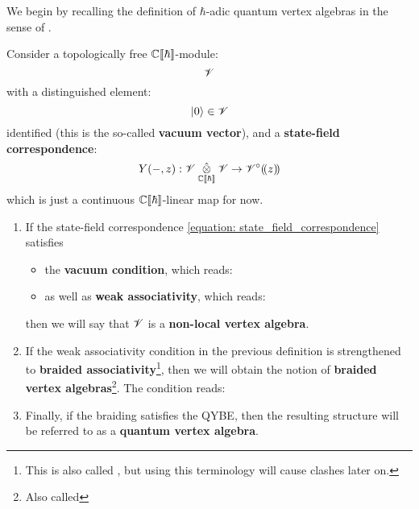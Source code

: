        We begin by recalling the definition of $\hbar$-adic quantum vertex algebras in the sense of \cite{etingof_kazhdan_quantisation_5}. 

        \begin{definition} \label{def: formal_quantum_vertex_algebras}
            Consider a topologically free $\mathbb{C}[\![\hbar]\!]$-module:
                $$\mathscr{V}$$
            with a distinguished element:
                $$\lvert {0} \rangle \in \mathscr{V}$$
            identified (this is the so-called \textbf{vacuum vector}), and a \textbf{state-field correspondence}:
            \begin{equation} \label{equation: state_field_correspondence}
                Y(-, z): \scrV \hattensor_{\bbC[\![\hbar]\!]} \scrV \to \scrV^{\circ}(\!(z)\!)
            \end{equation}
            which is just a continuous $\mathbb{C}[\![\hbar]\!]$-linear map for now.
            \begin{enumerate}
                \item If the state-field correspondence \eqref{equation: state_field_correspondence} satisfies \:
                \begin{itemize}
                    \item the \textbf{vacuum condition}, which reads:
                    \item as well as \textbf{weak associativity}, which reads:
                \end{itemize}
                then we will say that $\mathscr{V}$ is a \textbf{non-local vertex algebra}.
                
                
                \item If the weak associativity condition in the previous definition is strengthened to \textbf{braided associativity}\footnote{This is also called , but using this terminology will cause clashes later on.}, then we will obtain the notion of \textbf{braided vertex algebras}\footnote{Also called }. The condition reads:
                
                
                \item Finally, if the braiding satisfies the QYBE, then the resulting structure will be referred to as a \textbf{quantum vertex algebra}.
                
                
            \end{enumerate}
        \end{definition}

